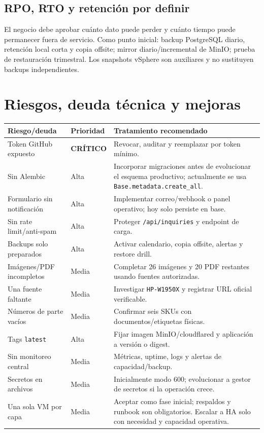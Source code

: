 \documentclass[11pt,a4paper]{article}
\newcommand{\critical}{\textcolor{danger}{\textbf{CRÍTICO}}}
\newcommand{\code}[1]{\nolinkurl{#1}}
\begin{document}
\subsection{RPO, RTO y retención por definir}

El negocio debe aprobar cuánto dato puede perder y cuánto tiempo puede permanecer fuera de servicio. Como punto inicial: backup PostgreSQL diario, retención local corta y copia offsite; mirror diario/incremental de MinIO; prueba de restauración trimestral. Los snapshots vSphere son auxiliares y no sustituyen backups independientes.

\section{Riesgos, deuda técnica y mejoras}

\begin{longtable}{L{5.0cm}L{2.2cm}L{7.8cm}}
\toprule
\textbf{Riesgo/deuda} & \textbf{Prioridad} & \textbf{Tratamiento recomendado}\\
\midrule
Token GitHub expuesto & \critical & Revocar, auditar y reemplazar por token mínimo.\\
Sin Alembic & Alta & Incorporar migraciones antes de evolucionar el esquema productivo; actualmente se usa \code{Base.metadata.create_all}.\\
Formulario sin notificación & Alta & Implementar correo/webhook o panel operativo; hoy solo persiste en base.\\
Sin rate limit/anti-spam & Alta & Proteger \code{/api/inquiries} y endpoint de carga.\\
Backups solo preparados & Alta & Activar calendario, copia offsite, alertas y restore drill.\\
Imágenes/PDF incompletos & Media & Completar 26 imágenes y 20 PDF restantes usando fuentes autorizadas.\\
Una fuente faltante & Media & Investigar \code{HP-W1950X} y registrar URL oficial verificable.\\
Números de parte vacíos & Media & Confirmar seis SKUs con documentos/etiquetas físicas.\\
Tags \code{latest} & Alta & Fijar imagen MinIO/cloudflared y aplicación a versión o digest.\\
Sin monitoreo central & Media & Métricas, uptime, logs y alertas de capacidad/backup.\\
Secretos en archivos & Media & Inicialmente modo 600; evolucionar a gestor de secretos si la operación crece.\\
Una sola VM por capa & Media & Aceptar como fase inicial; respaldos y runbook son obligatorios. Escalar a HA solo con necesidad y capacidad operativa.\\
\bottomrule
\end{longtable}
\end{document}

